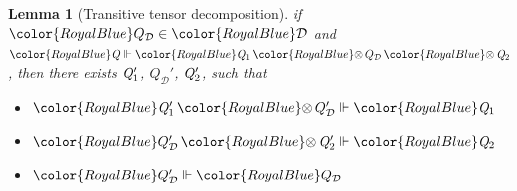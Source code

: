 \documentclass[acmsmall,usenames,dvipsnames,natbib=false,acmthm=false,screen]{acmart}
\newcommand{\constraintcolour}{\color{RoyalBlue}}
\newcommand{\constraintfont}[1]{{\constraintcolour#1}}
\newcommand{\constraintop}[1]{\mathop{\constraintfont{#1}}}
\newcommand{\qtensor}{\constraintop{\otimes}}
\theoremstyle{acmplain}
\newtheorem{lemma}[theorem]{Lemma}
\theoremstyle{acmdefinition}
\begin{document}
\begin{lemma}[Transitive tensor decomposition]
  \label{lem:transitive-tensor-decomposition}
  if $  \constraintfont{ Q_{\mathcal{D} } }   \in  \constraintfont{\mathcal{D} } $ and $ \constraintfont{ \ottnt{Q} }   \Vdash   \constraintfont{ \ottnt{Q_{{\mathrm{1}}}}  \qtensor  Q_{\mathcal{D} }  \qtensor  \ottnt{Q_{{\mathrm{2}}}} } $, then there
  exists $\mathit{Q'_{{\mathrm{1}}}}$, $Q_{\mathcal{D} }'$, $\mathit{Q'_{{\mathrm{2}}}}$, such that
  \begin{itemize}
  \item $ \constraintfont{ \ottnt{Q'_{{\mathrm{1}}}}  \qtensor  Q_{\mathcal{D} }' }   \Vdash   \constraintfont{ \ottnt{Q_{{\mathrm{1}}}} } $
  \item $ \constraintfont{ Q_{\mathcal{D} }'  \qtensor  \ottnt{Q'_{{\mathrm{2}}}} }   \Vdash   \constraintfont{ \ottnt{Q_{{\mathrm{2}}}} } $
  \item $ \constraintfont{ Q_{\mathcal{D} }' }   \Vdash   \constraintfont{ Q_{\mathcal{D} } } $
  \end{itemize}
\end{lemma}
\end{document}
